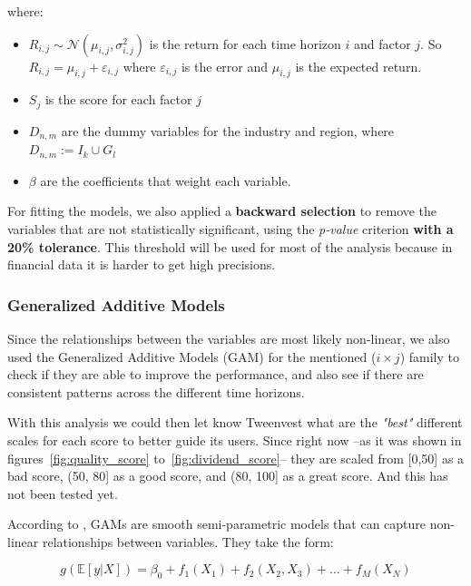 \documentclass[11pt,english,a4paper,hidelinks]{book}
\begin{document}
\noindent where:
\begin{itemize}
    \item  \(R_{i,j} \sim \mathcal{N}(\mu_{i,j}, \sigma_{i,j}^2)\) is the return for each time horizon \(i\) and factor \(j\). So \(R_{i,j} = \mu_{i,j} + \varepsilon_{i,j}\) where \(\varepsilon_{i,j}\) is the error and \(\mu_{i,j}\) is the expected return.
    \item \(S_j\) is the score for each factor \(j\)
    \item \(D_{n,m}\) are the dummy variables for the industry and region, where \(D_{n,m} := I_k \cup G_l\)
    \item \(\beta\) are the coefficients that weight each variable.
\end{itemize}

\noindent For fitting the models, we also applied a \textbf{backward selection} to remove the variables that are not statistically significant, using the \textit{p-value} criterion \textbf{with a 20\% tolerance}. This threshold will be used for most of the analysis because in financial data it is harder to get high precisions.

\subsubsection{Generalized Additive Models}

Since the relationships between the variables are most likely non-linear, we also used the Generalized Additive Models (GAM) for the mentioned (\(i \times j\)) family to check if they are able to improve the performance, and also see if there are consistent patterns across the different time horizons.

\vspace{0.5cm}
\noindent With this analysis we could then let know Tweenvest what are the \textit{"best"} different scales for each score to better guide its users. Since right now --as it was shown in figures~\ref{fig:quality_score} to~\ref{fig:dividend_score}-- they are scaled from [0,50] as a bad score, (50, 80] as a good score, and (80, 100] as a great score. And this has not been tested yet.

\vspace{0.5cm}
\noindent According to \textcite{pygam2018}, GAMs are smooth semi-parametric models that can capture non-linear relationships between variables. They take the form:

\begin{equation}
    g(\mathbb{E}[y|X]) = \beta_0 + f_1(X_1) + f_2(X_2,X_3) + \dots + f_M(X_N)
\end{equation}
\end{document}
